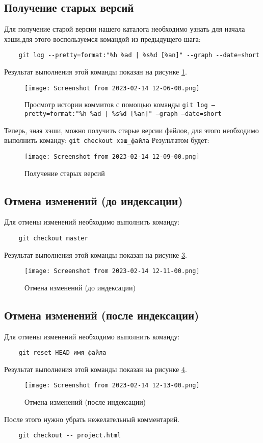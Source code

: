 \subsection{Получение старых версий}
Для получение старой версии нашего каталога необходимо узнать для начала хэши,для этого воспользуемся командой из предыдущего шага:
\begin{verbatim}
	git log --pretty=format:"%h %ad | %s%d [%an]" --graph --date=short
\end{verbatim}
Результат выполнения этой команды показан на рисунке \ref{fig:git:log:pretty:format}.
\begin{figure}[hp]
	\centering
	\texttt{[image: Screenshot from 2023-02-14 12-06-00.png]}
	\caption{Просмотр истории коммитов с помощью команды \texttt{git log --pretty=format:"\%h \%ad | \%s\%d [\%an]" --graph --date=short}}
	\label{fig:git:log:pretty:format}
\end{figure}
Теперь, зная хэши, можно получить старые версии файлов, для этого необходимо выполнить команду:
\texttt{git checkout хэш\_файла}
Результатом будет:
\begin{figure}
	\centering
	\texttt{[image: Screenshot from 2023-02-14 12-09-00.png]}
	\caption{Получение старых версий}
	\label{fig:git:checkout}
\end{figure}

\subsection{Отмена изменений (до индексации)}
Для отмены изменений необходимо выполнить команду:
\begin{verbatim}
	git checkout master
\end{verbatim}
Результат выполнения этой команды показан на рисунке \ref{fig:git:checkout:--}.
\begin{figure}[hp]
	\centering
	\texttt{[image: Screenshot from 2023-02-14 12-11-00.png]}
	\caption{Отмена изменений (до индексации)}
	\label{fig:git:checkout:--}
\end{figure}

\subsection{Отмена изменений (после индексации)}
Для отмены изменений необходимо выполнить команду:
\begin{verbatim}
	git reset HEAD имя_файла
\end{verbatim}
Результат выполнения этой команды показан на рисунке \ref{fig:git:reset:HEAD}.
\begin{figure}[hp]
	\centering
	\texttt{[image: Screenshot from 2023-02-14 12-13-00.png]}
	\caption{Отмена изменений (после индексации)}
	\label{fig:git:reset:HEAD}
\end{figure}
После этого нужно убрать нежелательный комментарий.
\begin{verbatim}
	git checkout -- project.html
\end{verbatim}

